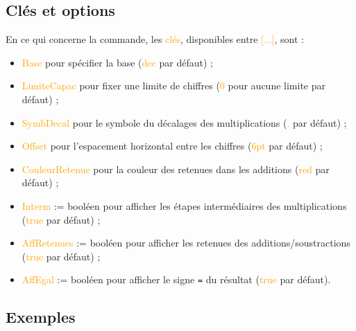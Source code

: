 \documentclass[french,a4paper,11pt]{article}
\newcommand\Cle[1]{{\small\sffamily\textlangle \textcolor{orange}{#1}\textrangle}}
\begin{document}
{{\subsection{Clés et options}

\begin{cautionblock}
En ce qui concerne la commande, les \Cle{clés}, disponibles entre \Cle{[...]}, sont :

\begin{itemize}
	\item \Cle{Base} pour spécifier la base (\Cle{dec} par défaut) ;
	\item \Cle{LimiteCapac} pour fixer une limite de chiffres (\Cle{0} pour aucune limite par défaut) ;
	\item \Cle{SymbDecal} pour le symbole du décalages des multiplications (\Cle{.} par défaut) ;
	\item \Cle{Offset} pour l'espacement horizontal entre les chiffres (\Cle{6pt} par défaut) ;
	\item \Cle{CouleurRetenue} pour la couleur des retenues dans les additions (\Cle{red} par défaut) ;
	\item \Cle{Interm} := booléen pour afficher les étapes intermédiaires des multiplications (\Cle{true} par défaut) ;
	\item \Cle{AffRetenues} := booléen pour afficher les retenues des additions/soustractions (\Cle{true} par défaut) ;
	\item \Cle{AffEgal} := booléen pour afficher le signe \texttt{=} du résultat (\Cle{true} par défaut).
\end{itemize}
\end{cautionblock}

\subsection{Exemples}

\begin{DemoCode}[]
\end{DemoCode}

\begin{DemoCode}[]

\end{DemoCode}

\begin{DemoCode}[]
\end{DemoCode}

}}
\end{document}
